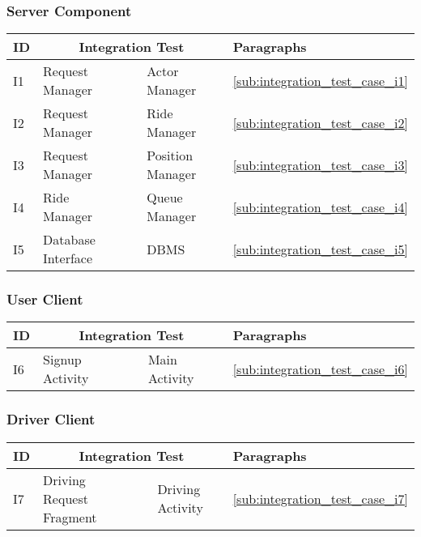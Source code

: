 \subsubsection{Server Component} %
\label{ssub:server_component}

\begin{tabular} { p{20.0pt} | p{135pt} p{20pt} p{100pt} | p{65pt} } \hline
	\textbf{ID} & \multicolumn {3}{|c|}{\textbf{Integration Test}} & \textbf{Paragraphs} \\ \hline
	I1 & Request Manager & \textrightarrow & Actor Manager & \ref{sub:integration_test_case_i1} \\ \hline
	I2 & Request Manager & \textrightarrow & Ride Manager & \ref{sub:integration_test_case_i2} \\ \hline
	I3 & Request Manager & \textrightarrow & Position Manager & \ref{sub:integration_test_case_i3} \\ \hline
	I4 & Ride Manager & \textrightarrow & Queue Manager & \ref{sub:integration_test_case_i4} \\ \hline
	I5 & Database Interface & \textrightarrow & DBMS & \ref{sub:integration_test_case_i5} \\ \hline
\end{tabular}

\subsubsection{User Client} %
\label{ssub:user_client}

\begin{tabular} { p{20.0pt} | p{135pt} p{20pt} p{100pt} | p{65pt} } \hline
	\textbf{ID} & \multicolumn {3}{|c|}{\textbf{Integration Test}} & \textbf{Paragraphs} \\ \hline
	I6 & Signup Activity & \textrightarrow & Main Activity & \ref{sub:integration_test_case_i6} \\ \hline
\end{tabular}

\subsubsection{Driver Client} %
\label{ssub:driver_client}

\begin{tabular} { p{20.0pt} | p{135pt} p{20pt} p{100pt} | p{65pt} } \hline
	\textbf{ID} & \multicolumn {3}{|c|}{\textbf{Integration Test}} & \textbf{Paragraphs} \\ \hline
	I7 & Driving Request Fragment & \textrightarrow & Driving Activity & \ref{sub:integration_test_case_i7} \\ \hline
\end{tabular}

